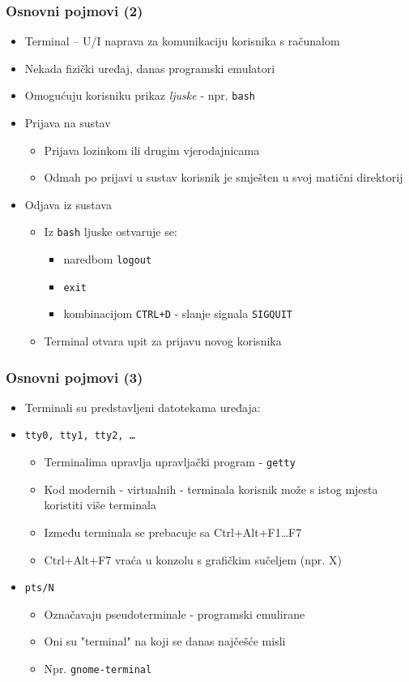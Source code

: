 \documentclass[table,usenames,dvipsnames] {beamer}
\newcommand{\shell}[1]{\texttt{#1}}
\begin{document}
\begin{frame}[t]
\frametitle{Osnovni pojmovi (2)}
\begin{itemize}
	\item Terminal -- U/I naprava za komunikaciju korisnika s računalom
	\item Nekada fizički uređaj, danas programski emulatori
	\item Omogućuju korisniku prikaz \textit{ljuske} - npr. \shell{bash}
  \item Prijava na sustav
  \begin{itemize}
  	\item Prijava lozinkom ili drugim vjerodajnicama
  	\item Odmah po prijavi u sustav korisnik je smješten u svoj matični direktorij
  \end{itemize}
  \item Odjava iz sustava
  \begin{itemize}
  	\item Iz \shell{bash} ljuske ostvaruje se:
    \begin{itemize}
      \item naredbom \shell{logout}
      \item \shell{exit} 
      \item kombinacijom \shell{CTRL+D} - slanje signala \shell{SIGQUIT}
    \end{itemize}
  	\item Terminal otvara upit za prijavu novog korisnika
  \end{itemize}
\end{itemize}
\end{frame}

\begin{frame}[t]
\frametitle{Osnovni pojmovi (3)}
  \begin{itemize}
  	\item Terminali su predstavljeni datotekama uređaja:
    \item[] \shell{tty0, tty1, tty2, \ldots}
    \begin{itemize}
    	\item Terminalima upravlja upravljački program - \shell{getty}
    	\item Kod modernih - virtualnih - terminala korisnik može s istog mjesta koristiti više terminala
	  \item Između terminala se prebacuje sa Ctrl+Alt+F1\ldots F7
    \item Ctrl+Alt+F7 vraća u konzolu s grafičkim sučeljem (npr. X)
    \end{itemize}
    \item[] \shell{pts/N}
    \begin{itemize}
      \item Označavaju pseudoterminale - programski emulirane
      \item Oni su "terminal" na koji se danas najčešće misli
      \item[] Npr. \shell{gnome-terminal}
    \end{itemize}
  \end{itemize}
\end{frame}
\end{document}
